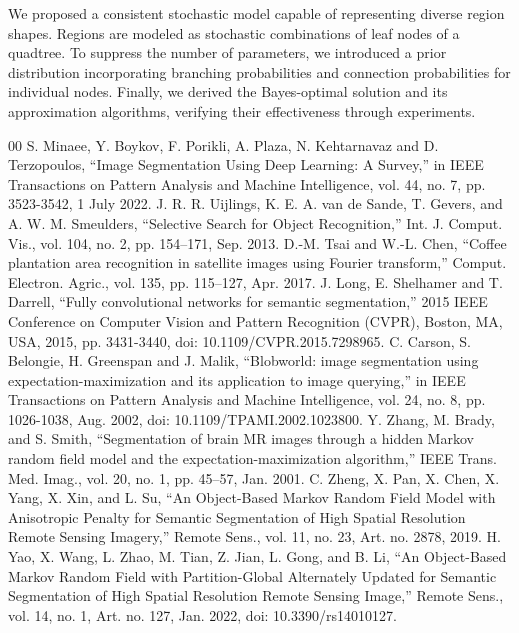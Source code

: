 \documentclass[conference]{IEEEtran}
\theoremstyle{definition}
\begin{document}
  We proposed a consistent stochastic model capable of representing diverse region shapes. Regions are modeled as stochastic combinations of leaf nodes of a quadtree. To suppress the number of parameters, we introduced a prior distribution incorporating branching probabilities and connection probabilities for individual nodes. Finally, we derived the Bayes-optimal solution and its approximation algorithms, verifying their effectiveness through experiments.








\begin{thebibliography}{00}
   S. Minaee, Y. Boykov, F. Porikli, A. Plaza, N. Kehtarnavaz and D. Terzopoulos, ``Image Segmentation Using Deep Learning: A Survey,'' in IEEE Transactions on Pattern Analysis and Machine Intelligence, vol. 44, no. 7, pp. 3523-3542, 1 July 2022.
   J. R. R. Uijlings, K. E. A. van de Sande, T. Gevers, and A. W. M. Smeulders, ``Selective Search for Object Recognition,'' Int. J. Comput. Vis., vol. 104, no. 2, pp. 154–171, Sep. 2013.
   D.-M. Tsai and W.-L. Chen, ``Coffee plantation area recognition in satellite images using Fourier transform,'' Comput. Electron. Agric., vol. 135, pp. 115–127, Apr. 2017.
   J. Long, E. Shelhamer and T. Darrell, ``Fully convolutional networks for semantic segmentation,'' 2015 IEEE Conference on Computer Vision and Pattern Recognition (CVPR), Boston, MA, USA, 2015, pp. 3431-3440, doi: 10.1109/CVPR.2015.7298965.
   C. Carson, S. Belongie, H. Greenspan and J. Malik, ``Blobworld: image segmentation using expectation-maximization and its application to image querying,'' in IEEE Transactions on Pattern Analysis and Machine Intelligence, vol. 24, no. 8, pp. 1026-1038, Aug. 2002, doi: 10.1109/TPAMI.2002.1023800.
   Y. Zhang, M. Brady, and S. Smith, ``Segmentation of brain MR images through a hidden Markov random field model and the expectation-maximization algorithm,'' IEEE Trans. Med. Imag., vol. 20, no. 1, pp. 45–57, Jan. 2001.
   C. Zheng, X. Pan, X. Chen, X. Yang, X. Xin, and L. Su, ``An Object-Based Markov Random Field Model with Anisotropic Penalty for Semantic Segmentation of High Spatial Resolution Remote Sensing Imagery,'' Remote Sens., vol. 11, no. 23, Art. no. 2878, 2019.
   H. Yao, X. Wang, L. Zhao, M. Tian, Z. Jian, L. Gong, and B. Li, ``An Object-Based Markov Random Field with Partition-Global Alternately Updated for Semantic Segmentation of High Spatial Resolution Remote Sensing Image,'' Remote Sens., vol. 14, no. 1, Art. no. 127, Jan. 2022, doi: 10.3390/rs14010127.

\end{thebibliography}
\end{document}
